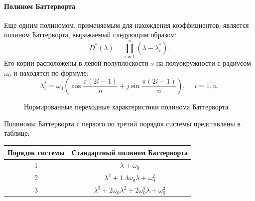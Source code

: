 \paragraph*{Полином Баттерворта\\}
\hspace*{\parindent}Еще одним полиномом, применяемым для нахождения коэффициентов, является полином Баттерворта, выражаемый следующим образом: 
\begin{equation}
	D^*(\lambda)=\prod_{i=1}^{n}(\lambda-\lambda_i^*).
\end{equation}
Его корни расположены в левой полуплоскости $s$ на полуокружности с радиусом $\omega_0$ и находятся по формуле:
\begin{equation}
	\lambda_i^*=\omega_0(\cos{\frac{\pi(2i-1)}{n}}+j\sin{\frac{\pi(2i-1)}{n}}),\phantom{-}i=\overline{1,n}.
\end{equation}\begin{figure}[h]
	\noindent{}
	\caption{Нормированные переходные характеристики полинома Баттерворта}
	\label{buttergraph}
\end{figure}

Полиномы Баттерворта с первого по третий порядок системы представлены в таблице:
\begin{center}
\begin{tabular}{ |c|c| } 
 \hline
 Порядок системы &  Стандартный полином Баттерворта \\ 
 \hline
 1 & $\lambda+\omega_0$ \\ 
 \hline
 2 & $\lambda^2+1.4\omega_0\lambda+\omega_0^2$ \\ 
 \hline
 3 & $\lambda^3+2\omega_0\lambda^2+2\omega_0^2\lambda+\omega_0^3$ \\ 
 \hline
\end{tabular}
\end{center}


